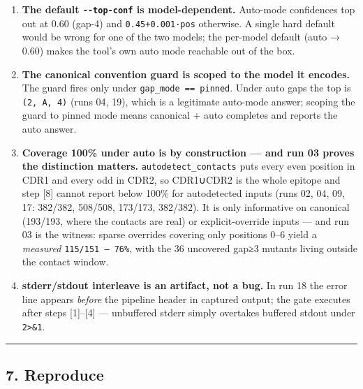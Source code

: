 \begin{enumerate}
\def\labelenumi{\arabic{enumi}.}
\tightlist
\item
  \textbf{The default \texttt{-\/-top-conf} is model-dependent.}
  Auto-mode confidences top out at 0.60 (gap-4) and
  \texttt{0.45+0.001·pos} otherwise. A single hard default would be
  wrong for one of the two models; the per-model default (auto → 0.60)
  makes the tool's own auto mode reachable out of the box.
\item
  \textbf{The canonical convention guard is scoped to the model it
  encodes.} The guard fires only under
  \texttt{gap\_mode\ ==\ \textquotesingle{}pinned\textquotesingle{}}.
  Under auto gaps the top is
  \texttt{(2,\ \textquotesingle{}A\textquotesingle{},\ 4)} (runs 04,
  19), which is a legitimate auto-mode answer; scoping the guard to
  pinned mode means canonical + auto completes and reports the auto
  answer.
\item
  \textbf{Coverage 100\% under auto is by construction --- and run 03
  proves the distinction matters.} \texttt{autodetect\_contacts} puts
  every even position in CDR1 and every odd in CDR2, so CDR1∪CDR2 is the
  whole epitope and step {[}8{]} cannot report below 100\% for
  autodetected inputs (runs 02, 04, 09, 17: 382/382, 508/508, 173/173,
  382/382). It is only informative on canonical (193/193, where the
  contacts are real) or explicit-override inputs --- and run 03 is the
  witness: sparse overrides covering only positions 0--6 yield a
  \emph{measured} \texttt{115/151\ —\ 76\%}, with the 36 uncovered gap≥3
  mutants living outside the contact window.
\item
  \textbf{stderr/stdout interleave is an artifact, not a bug.} In run 18
  the error line appears \emph{before} the pipeline header in captured
  output; the gate executes after steps {[}1{]}--{[}4{]} --- unbuffered
  stderr simply overtakes buffered stdout under
  \texttt{2\textgreater{}\&1}.
\end{enumerate}

\begin{center}\rule{0.5\linewidth}{0.5pt}\end{center}

\hypertarget{reproduce}{%
\subsection{7. Reproduce}\label{reproduce}}

